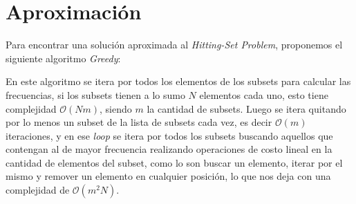 \section{Aproximación}

Para encontrar una solución aproximada al \textit{Hitting-Set Problem},
proponemos el siguiente algoritmo \textit{Greedy}:



En este algoritmo se itera por todos los elementos de los subsets para calcular
las frecuencias, si los subsets tienen a lo sumo $N$ elementos cada uno, esto
tiene complejidad $\mathcal{O}(Nm)$, siendo $m$ la cantidad de subsets. Luego
se itera quitando por lo menos un subset de la lista de subsets cada vez, es
decir $\mathcal{O}(m)$ iteraciones, y en ese \textit{loop} se itera por todos
los subsets buscando aquellos que contengan al de mayor frecuencia realizando
operaciones de costo lineal en la cantidad de elementos del subset, como lo son
buscar un elemento, iterar por el mismo y remover un elemento en cualquier
posición, lo que nos deja con una complejidad de $\mathcal{O}(m^2N)$.
